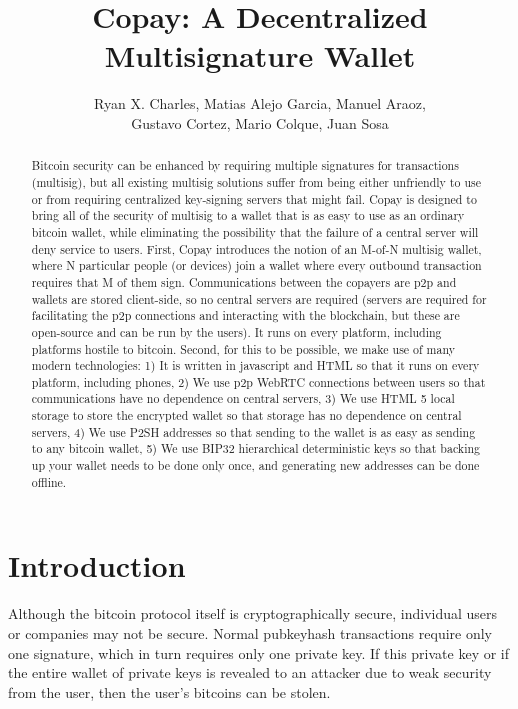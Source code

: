 \documentclass{article}
\begin{document}
\pagestyle{headings}
\title{Copay: A Decentralized Multisignature Wallet}
\author{
Ryan X. Charles,
Matias Alejo Garcia,
Manuel Araoz,\\
Gustavo Cortez,
Mario Colque,
Juan Sosa
}
\date{}
\maketitle
\begin{abstract}
Bitcoin security can be enhanced by requiring multiple signatures for transactions (multisig), but all existing multisig solutions suffer from being either unfriendly to use or from requiring centralized key-signing servers that might fail.
Copay is designed to bring all of the security of multisig to a wallet that is as easy to use as an ordinary bitcoin wallet, while eliminating the possibility that the failure of a central server will deny service to users.
First, Copay introduces the notion of an M-of-N multisig wallet, where N particular people (or devices) join a wallet where every outbound transaction requires that M of them sign.
Communications between the copayers are p2p and wallets are stored client-side, so no central servers are required (servers are required for facilitating the p2p connections and interacting with the blockchain, but these are open-source and can be run by the users).
It runs on every platform, including platforms hostile to bitcoin.
Second, for this to be possible, we make use of many modern technologies:
1) It is written in javascript and HTML so that it runs on every platform, including phones,
2) We use p2p WebRTC connections between users so that communications have no dependence on central servers,
3) We use HTML 5 local storage to store the encrypted wallet so that storage has no dependence on central servers,
4) We use P2SH addresses so that sending to the wallet is as easy as sending to any bitcoin wallet,
5) We use BIP32 hierarchical deterministic keys so that backing up your wallet needs to be done only once, and generating new addresses can be done offline.
\end{abstract}

\section{Introduction}

Although the bitcoin protocol itself is cryptographically secure, individual users or companies may not be secure.
Normal pubkeyhash transactions require only one signature, which in turn requires only one private key.
If this private key or if the entire wallet of private keys is revealed to an attacker due to weak security from the user, then the user's bitcoins can be stolen.
\end{document}
